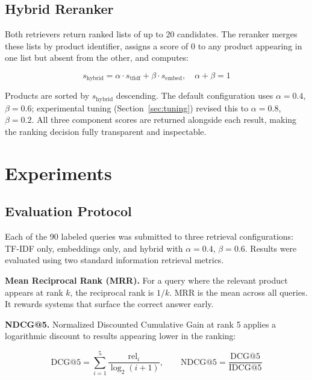 \documentclass[11pt,a4paper]{article}
\begin{document}
\subsection{Hybrid Reranker}

Both retrievers return ranked lists of up to 20 candidates. The reranker
merges these lists by product identifier, assigns a score of 0 to any
product appearing in one list but absent from the other, and computes:

\begin{equation}
s_\text{hybrid} = \alpha \cdot s_\text{tfidf} + \beta \cdot s_\text{embed},
\quad \alpha + \beta = 1
\label{eq:hybrid}
\end{equation}

Products are sorted by $s_\text{hybrid}$ descending. The default
configuration uses $\alpha=0.4$, $\beta=0.6$; experimental tuning
(Section~\ref{sec:tuning}) revised this to $\alpha=0.8$, $\beta=0.2$.
All three component scores are returned alongside each result, making the
ranking decision fully transparent and inspectable.

\section{Experiments}
\label{sec:experiments}

\subsection{Evaluation Protocol}

Each of the 90 labeled queries was submitted to three retrieval
configurations: TF-IDF only, embeddings only, and hybrid with
$\alpha=0.4$, $\beta=0.6$. Results were evaluated using two standard
information retrieval metrics.

\textbf{Mean Reciprocal Rank (MRR).} For a query where the relevant
product appears at rank $k$, the reciprocal rank is $1/k$. MRR is the
mean across all queries. It rewards systems that surface the correct
answer early.

\textbf{NDCG@5.} Normalized Discounted Cumulative Gain at rank 5 applies
a logarithmic discount to results appearing lower in the ranking:

\begin{equation}
\text{DCG@5} = \sum_{i=1}^{5} \frac{\text{rel}_i}{\log_2(i+1)}, \qquad
\text{NDCG@5} = \frac{\text{DCG@5}}{\text{IDCG@5}}
\end{equation}
\end{document}
